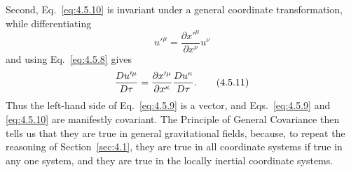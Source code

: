 Second, Eq.~\eqref{eq:4.5.10} is invariant under a general coordinate
transformation, while differentiating
\[
  u'^\mu
  =
  \frac{\partial x'^\mu}{\partial x^\nu}u^\nu
\]
and using Eq.~\eqref{eq:4.5.8} gives
\begin{equation}
  \frac{D u'^\mu}{D\tau}
  =
  \frac{\partial x'^\mu}{\partial x^\kappa}
  \frac{D u^\kappa}{D\tau}.
  \tag{4.5.11}\label{eq:4.5.11}
\end{equation}
Thus the left-hand side of Eq.~\eqref{eq:4.5.9} is a vector, and
Eqs.~\eqref{eq:4.5.9} and \eqref{eq:4.5.10} are manifestly covariant. The
Principle of General Covariance then tells us that they are true in general
gravitational fields, because, to repeat the reasoning of Section~\ref{sec:4.1},
they are true in all coordinate systems if true in any one system, and they
are true in the locally inertial coordinate systems.
